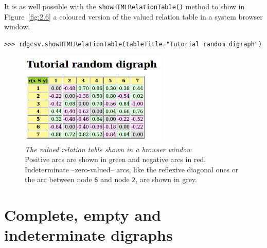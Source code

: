 It is as well possible with the \texttt{showHTMLRelationTable()} method to show in Figure~\vref{fig:2.6} a coloured version of the valued relation table in a system browser window. 
\begin{lstlisting}
>>> rdgcsv.showHTMLRelationTable(tableTitle="Tutorial random digraph")
\end{lstlisting}
 \begin{figure}[ht]
\sidecaption[t]
\includegraphics[width=7cm]{Figures/2-6-htmlTutorialDigraph.png}
\caption[The valued relation table shown in a browser window]{\emph{The valued relation table shown in a browser window}\\ Positive arcs are shown in green and negative arcs in red. Indeterminate --zero-valued-- arcs, like the reflexive diagonal ones or the arc between node \texttt{6} and node \texttt{2}, are shown in grey.}
\label{fig:2.6}       %
\end{figure}
 
\section{Complete, empty and indeterminate digraphs}
\label{sec:2.10}

